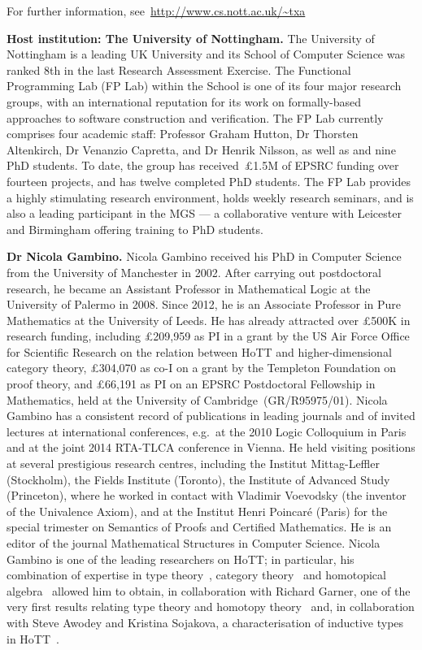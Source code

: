 \documentclass[a4paper,11pt]{article}
\begin{document}
For further information, see~\url{http://www.cs.nott.ac.uk/~txa}

\textbf{Host institution: The University of Nottingham.}  The
University of Nottingham is a leading UK University 
and its School of Computer Science was ranked 8th in the last Research
Assessment Exercise. The Functional Programming Lab (FP Lab) within the School
is one of its four major research groups, with an international
reputation for its work on formally-based approaches to software
construction and verification.  The FP Lab currently comprises four
academic staff: Professor Graham Hutton, Dr Thorsten Altenkirch, Dr
Venanzio Capretta, and Dr Henrik Nilsson, as well as and nine PhD students.
To date, the group has received~\pounds1.5M of EPSRC funding over fourteen
projects, and has twelve completed PhD students.
The FP Lab provides a highly stimulating research environment,
holds weekly research seminars, and is also a leading participant in the MGS
--- a collaborative venture with Leicester and Birmingham offering training
to PhD students.
\noindent

\textbf{Dr Nicola Gambino.} Nicola Gambino received his PhD in
Computer Science from the University of Manchester in 2002. After
carrying out postdoctoral research, he became an Assistant Professor
in Mathematical Logic at the University of Palermo in 2008. Since
 2012, he is an Associate Professor in Pure Mathematics at
the University of Leeds. He has already attracted over \pounds500K 
in research funding, including \pounds 209,959 as PI in a grant
by the US Air Force Office for Scientific
Research on the relation between HoTT and
higher-dimensional category theory,  \pounds 304,070 as co-I on a  grant 
by the Templeton Foundation on proof theory, and \pounds 66,191 as PI on
an EPSRC  Postdoctoral Fellowship in Mathematics, 
held at the University of Cambridge~(GR/R95975/01).
Nicola Gambino has a consistent record of
publications in leading journals and of invited lectures at
international conferences, {e.g.}~at the 2010 Logic Colloquium in Paris
and at the  joint 2014 RTA-TLCA conference in Vienna. He
held visiting positions at several prestigious research centres,
including the Institut Mittag-Leffler (Stockholm), the
Fields Institute (Toronto), the Institute of Advanced Study
(Princeton), where he worked in contact with Vladimir Voevodsky (the inventor of 
the Univalence Axiom), and at the Institut Henri Poincar\'e (Paris) for the special trimester on
Semantics of Proofs and Certified Mathematics.  He is an editor of the
journal Mathematical Structures in Computer Science. 
Nicola Gambino is one of the leading researchers on HoTT; in particular,
his combination of expertise in type theory~\cite{GambinoN:gentti}, category 
theory~\cite{GambinoN:polfpm} and
homotopical algebra~\cite{GambinoN:homl2c,GambinoN:weilsh} allowed
him to obtain, in collaboration with Richard Garner, 
one of the very first results relating type theory and homotopy theory~\cite{GambinoN:idetwfs}
and, in collaboration with Steve Awodey and Kristina Sojakova, a characterisation of 
inductive types  in HoTT~\cite{awodeyGamSoja:indTypesInHTT}.
\end{document}

